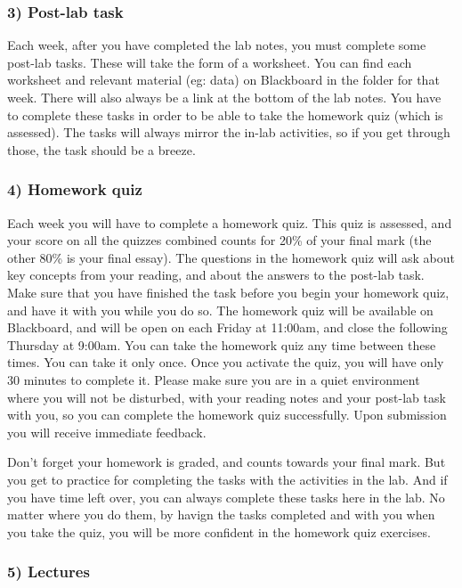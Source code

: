 \documentclass[]{book}
\theoremstyle{definition}
\theoremstyle{definition}
\theoremstyle{definition}
\theoremstyle{remark}
\begin{document}
\hypertarget{post-lab-task}{%
\subsubsection{3) Post-lab task}\label{post-lab-task}}

Each week, after you have completed the lab notes, you must complete
some post-lab tasks. These will take the form of a worksheet. You can
find each worksheet and relevant material (eg: data) on Blackboard in
the folder for that week. There will also always be a link at the bottom
of the lab notes. You have to complete these tasks in order to be able
to take the homework quiz (which is assessed). The tasks will always
mirror the in-lab activities, so if you get through those, the task
should be a breeze.

\hypertarget{homework-quiz}{%
\subsubsection{4) Homework quiz}\label{homework-quiz}}

Each week you will have to complete a homework quiz. This quiz is
assessed, and your score on all the quizzes combined counts for 20\% of
your final mark (the other 80\% is your final essay). The questions in
the homework quiz will ask about key concepts from your reading, and
about the answers to the post-lab task. Make sure that you have finished
the task before you begin your homework quiz, and have it with you while
you do so. The homework quiz will be available on Blackboard, and will
be open on each Friday at 11:00am, and close the following Thursday at
9:00am. You can take the homework quiz any time between these times. You
can take it only once. Once you activate the quiz, you will have only 30
minutes to complete it. Please make sure you are in a quiet environment
where you will not be disturbed, with your reading notes and your
post-lab task with you, so you can complete the homework quiz
successfully. Upon submission you will receive immediate feedback.

Don't forget your homework is graded, and counts towards your final
mark. But you get to practice for completing the tasks with the
activities in the lab. And if you have time left over, you can always
complete these tasks here in the lab. No matter where you do them, by
havign the tasks completed and with you when you take the quiz, you will
be more confident in the homework quiz exercises.

\hypertarget{lectures}{%
\subsubsection{5) Lectures}\label{lectures}}
\end{document}
